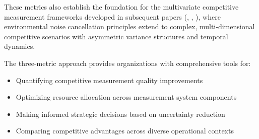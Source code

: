 These metrics also establish the foundation for the multivariate competitive measurement frameworks developed in subsequent papers (\papertwo, \paperthree, \paperfour), where environmental noise cancellation principles extend to complex, multi-dimensional competitive scenarios with asymmetric variance structures and temporal dynamics.

The three-metric approach provides organizations with comprehensive tools for:
\begin{itemize}
\item Quantifying competitive measurement quality improvements
\item Optimizing resource allocation across measurement system components
\item Making informed strategic decisions based on uncertainty reduction
\item Comparing competitive advantages across diverse operational contexts
\end{itemize}